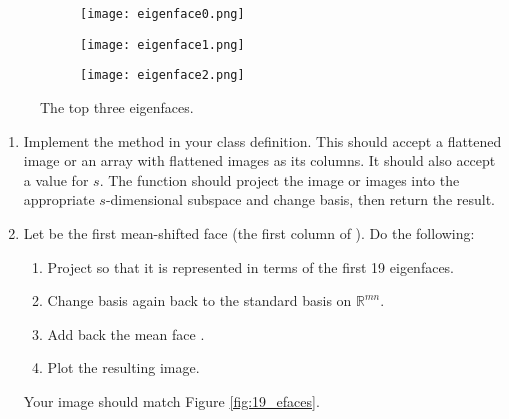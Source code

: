 \begin{figure}
\begin{subfigure}[b]{0.3\textwidth}
\texttt{[image: eigenface0.png]}
\end{subfigure}
\begin{subfigure}[b]{0.3\textwidth}
\texttt{[image: eigenface1.png]}
\end{subfigure}
\begin{subfigure}[b]{0.3\textwidth}
\texttt{[image: eigenface2.png]}
\end{subfigure}
\caption{The top three eigenfaces.}
\label{facialRecognition:eigenfaces}
\end{figure}

\begin{problem}
\label{prob:top_n}
\leavevmode
\begin{enumerate}
\item Implement the method   in your class definition.
This should accept a flattened image or an array with flattened images as its columns.
It should also accept a value for $s$.
The function should project the image or images into the appropriate $s$-dimensional subspace and change basis, then return the result.
\item Let  be the first mean-shifted face (the first column of ). Do the following:
\begin{enumerate}
\item Project  so that it is represented in terms of the first 19 eigenfaces.
\item Change basis again back to the standard basis on $\mathbb{R}^{mn}$.
\item Add back the mean face .
\item Plot the resulting image.
\end{enumerate}
Your image should match Figure \ref{fig:19_efaces}.
\end{enumerate}
\end{problem}



